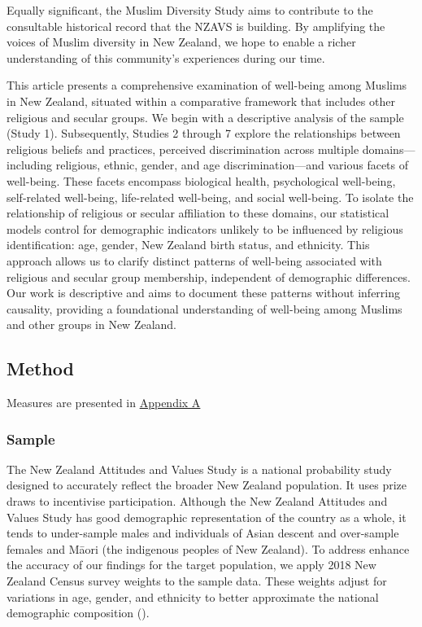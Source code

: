 \documentclass[
  single column]{article}
\begin{document}
Equally significant, the Muslim Diversity Study aims to contribute to
the consultable historical record that the NZAVS is building. By
amplifying the voices of Muslim diversity in New Zealand, we hope to
enable a richer understanding of this community's experiences during our
time.

This article presents a comprehensive examination of well-being among
Muslims in New Zealand, situated within a comparative framework that
includes other religious and secular groups. We begin with a descriptive
analysis of the sample (Study 1). Subsequently, Studies 2 through 7
explore the relationships between religious beliefs and practices,
perceived discrimination across multiple domains---including religious,
ethnic, gender, and age discrimination---and various facets of
well-being. These facets encompass biological health, psychological
well-being, self-related well-being, life-related well-being, and social
well-being. To isolate the relationship of religious or secular
affiliation to these domains, our statistical models control for
demographic indicators unlikely to be influenced by religious
identification: age, gender, New Zealand birth status, and ethnicity.
This approach allows us to clarify distinct patterns of well-being
associated with religious and secular group membership, independent of
demographic differences. Our work is descriptive and aims to document
these patterns without inferring causality, providing a foundational
understanding of well-being among Muslims and other groups in New
Zealand.

\subsection{Method}\label{method}

Measures are presented in \hyperref[appendix-a]{Appendix A}

\subsubsection{Sample}\label{sample}

The New Zealand Attitudes and Values Study is a national probability
study designed to accurately reflect the broader New Zealand population.
It uses prize draws to incentivise participation. Although the New
Zealand Attitudes and Values Study has good demographic representation
of the country as a whole, it tends to under-sample males and
individuals of Asian descent and over-sample females and Māori (the
indigenous peoples of New Zealand). To address enhance the accuracy of
our findings for the target population, we apply 2018 New Zealand Census
survey weights to the sample data. These weights adjust for variations
in age, gender, and ethnicity to better approximate the national
demographic composition ().
\end{document}

